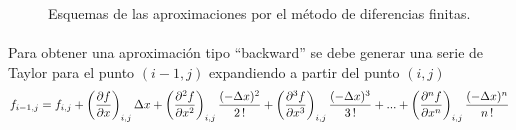 \documentclass[letterpaper, openright, 12pt]{book}
\begin{document}
	\begin{figure}[htbp!]
		\centering
		\caption[Aproximaciones por Diferencias Finitas]{Esquemas de las aproximaciones por el método de diferencias finitas.\cite{chapra}}
	\end{figure}
	
	\paragraph*{}
	Para obtener una aproximación tipo ``backward'' se debe generar una serie de Taylor para el punto $(i-1, j)$ expandiendo a partir del punto $(i, j)$
	\begin{equation}
	f_{i-1, j} = f_{i,j} + \left( \pdv{f}{x}\right)_{i,j} \Delta x + \left( \pdv[2]{f}{x} \right)_{i,j} \frac{(-\Delta x)^2 }{2\,!}  + \left( \pdv[3]{f}{x} \right)_{i,j} \frac{(-\Delta x)^3}{3\,!} + ... + \left( \pdv[n]{f}{x} \right)_{i,j} \frac{(-\Delta x)^n}{n\,!}
	\label{taylor-backward}
	\end{equation}
\end{document}
